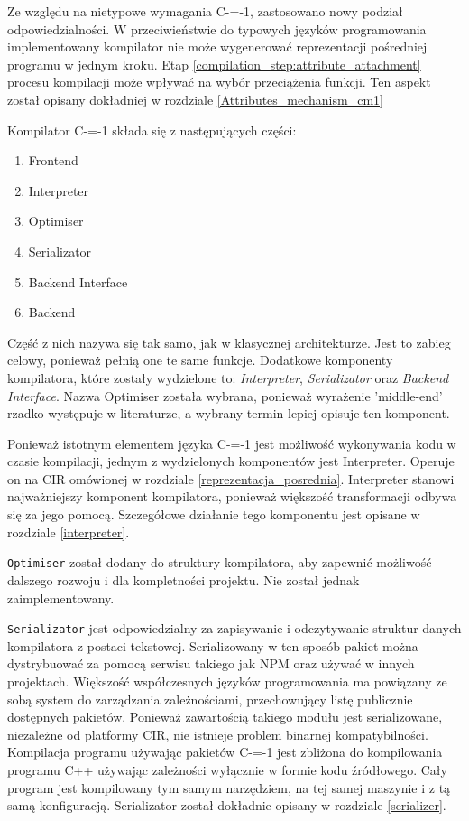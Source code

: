 Ze względu na nietypowe wymagania C-=-1, zastosowano nowy podział odpowiedzialności.
W przeciwieństwie do typowych języków programowania implementowany kompilator nie może wygenerować reprezentacji pośredniej programu w jednym kroku.
Etap \ref{compilation_step:attribute_attachment} procesu kompilacji może wpływać na wybór przeciążenia funkcji.
Ten aspekt został opisany dokładniej w rozdziale \ref{Attributes_mechanism_cm1}

Kompilator C-=-1 składa się z następujących części:
\begin{enumerate}
  \item Frontend
  \item Interpreter
  \item Optimiser
  \item Serializator
  \item Backend Interface
  \item Backend
\end{enumerate}
Część z nich nazywa się tak samo, jak w klasycznej architekturze. Jest to zabieg celowy, ponieważ pełnią one te same funkcje. 
Dodatkowe komponenty kompilatora, które zostały wydzielone to: \emph{Interpreter}, \emph{Serializator} oraz \emph{Backend Interface}. 
Nazwa Optimiser została wybrana, ponieważ wyrażenie 'middle-end' rzadko występuje w literaturze, a wybrany termin lepiej opisuje ten komponent.

Ponieważ istotnym elementem języka C-=-1 jest możliwość wykonywania kodu w czasie kompilacji, jednym z wydzielonych komponentów jest Interpreter.
Operuje on na CIR omówionej w rozdziale \ref{reprezentacja_posrednia}.
Interpreter stanowi najważniejszy komponent kompilatora, ponieważ większość transformacji odbywa się za jego pomocą. 
Szczegółowe działanie tego komponentu jest opisane w rozdziale \ref{interpreter}.

\lstinline{Optimiser} został dodany do struktury kompilatora, aby zapewnić możliwość dalszego rozwoju i dla kompletności projektu. Nie został jednak zaimplementowany.

\lstinline{Serializator} jest odpowiedzialny za zapisywanie i odczytywanie struktur danych kompilatora z postaci tekstowej.
Serializowany w ten sposób pakiet można dystrybuować za pomocą serwisu takiego jak NPM \cite{npm} oraz używać w innych projektach.
Większość współczesnych języków programowania ma powiązany ze sobą system do zarządzania zależnościami, przechowujący listę publicznie dostępnych pakietów.
Ponieważ zawartością takiego modułu jest serializowane, niezależne od platformy CIR, nie istnieje problem binarnej kompatybilności.
Kompilacja programu używając pakietów C-=-1 jest zbliżona do kompilowania programu C++ używając zależności wyłącznie w formie kodu źródłowego.
Cały program jest kompilowany tym samym narzędziem, na tej samej maszynie i z tą samą konfiguracją.
Serializator został dokładnie opisany w rozdziale \ref{serializer}.

